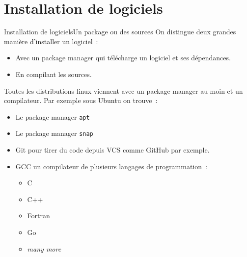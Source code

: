 \documentclass{beamer}
\begin{document}
    \section{Installation de logiciels}\label{sec:installation}

    \begin{frame}{Installation de logiciels}{Un package ou des sources}
        On distingue deux grandes manière d'installer un logiciel~:
        \begin{itemize}
            \item Avec un package manager qui télécharge un logiciel et ses dépendances.
            \item En compilant les sources.
        \end{itemize}
        \bigbreak
        Toutes les distributions linux viennent avec un package manager au moin et un compilateur.
        Par exemple sous Ubuntu on trouve~:
        \begin{itemize}
            \item Le package manager \lstinline{apt}
            \item Le package manager \lstinline{snap}
            \item Git pour tirer du code depuis VCS comme GitHub par exemple.
            \item GCC un compilateur de plusieurs langages de programmation~:
            \begin{itemize}
                \item C
                \item C++
                \item Fortran
                \item Go
                \item \textit{many more}
            \end{itemize}
        \end{itemize}
    \end{frame}
\end{document}
